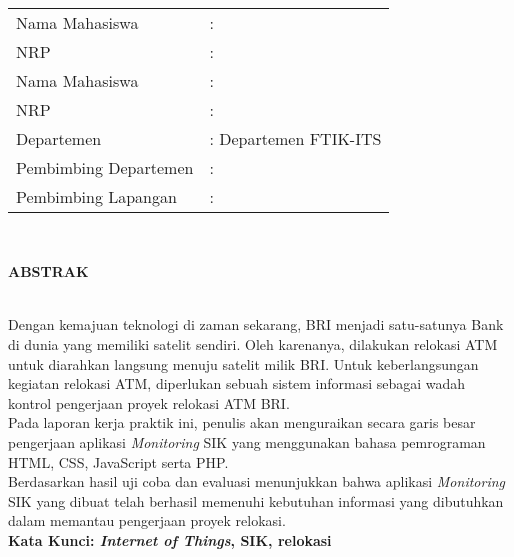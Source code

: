 \thispagestyle{plain}
\begin{centering}
	\textbf{\MakeUppercase{\judul}}
\end{centering} \\[20pt]
\begin{tabular}{ll}
	Nama Mahasiswa  &: \MakeUppercase{\namaPenulisSatu} \\
	NRP &: \nrpPenulisSatu \\
	Nama Mahasiswa  & : \MakeUppercase{\namaPenulisDua} \\
	NRP &: \nrpPenulisDua \\
	Departemen  &: Departemen \departemen FTIK-ITS \\
	Pembimbing Departemen  &: \pembimbingDept \\
	Pembimbing Lapangan  &: \pembimbingLap
\end{tabular} \\[10pt]
\begin{center}
	\textbf{ABSTRAK}
\end{center}\\
\indent\indent Dengan kemajuan teknologi di zaman sekarang, BRI menjadi satu-satunya Bank di dunia yang memiliki satelit sendiri. Oleh karenanya, dilakukan relokasi ATM untuk diarahkan langsung menuju satelit milik BRI. Untuk keberlangsungan kegiatan relokasi ATM, diperlukan sebuah sistem informasi sebagai wadah kontrol pengerjaan proyek relokasi ATM BRI.\\
\indent Pada laporan kerja praktik ini, penulis akan menguraikan secara garis besar pengerjaan aplikasi \textit{Monitoring} SIK yang menggunakan bahasa pemrograman HTML, CSS, JavaScript serta PHP.\\
\indent Berdasarkan hasil uji coba dan evaluasi menunjukkan bahwa aplikasi \textit{Monitoring} SIK yang dibuat telah berhasil memenuhi kebutuhan informasi yang dibutuhkan dalam memantau pengerjaan proyek relokasi. \\[10pt]
\textbf{Kata Kunci: \textit{Internet of Things}, SIK, relokasi}


\cleardoublepage
